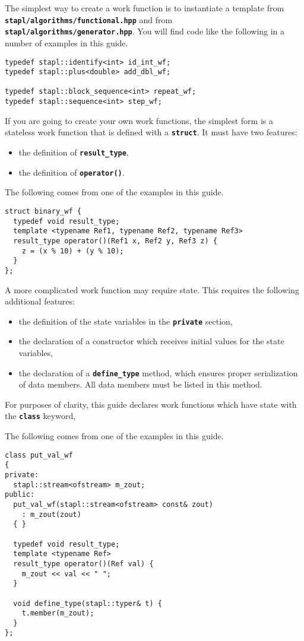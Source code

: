 \documentclass{report}
\begin{document}
The simplest way to create a work function is to instantiate a template
from \texttt{{\bf stapl/algorithms/functional.hpp}} and
from \texttt{{\bf stapl/algorithms/generator.hpp}}. 
You will find code like the following in a number of examples in this guide.

\small
\begin{verbatim}
typedef stapl::identify<int> id_int_wf;
typedef stapl::plus<double> add_dbl_wf;

typedef stapl::block_sequence<int> repeat_wf;
typedef stapl::sequence<int> step_wf;
\end{verbatim}
\normalsize

If you are going to create your own work functions, the simplest form
is a stateless work function that is defined with a 
\texttt{{\bf struct}}.
It must have two features:
\begin{itemize}
\item
the definition of \texttt{{\bf result\_type}},
\item
the definition of \texttt{{\bf operator()}}.
\end{itemize}
The following comes from one of the examples in this guide.

\small
\begin{verbatim}
struct binary_wf {
  typedef void result_type;
  template <typename Ref1, typename Ref2, typename Ref3>
  result_type operator()(Ref1 x, Ref2 y, Ref3 z) {
    z = (x % 10) + (y % 10);
  }
};
\end{verbatim}
\normalsize

A more complicated work function may require state. This requires
the following additional features:
\begin{itemize}
\item
the definition of the state variables in the \texttt{{\bf private}} section,
\item
the declaration of a constructor which receives initial values for the
state variables,
\item
the declaration of a \texttt{{\bf define\_type}} method, which ensures
proper serialization of data members.  All data members must be listed
in this method.
\end{itemize}
For purposes of clarity, this guide declares work functions which have
state with the \texttt{{\bf class}} keyword,

The following comes from one of the examples in this guide.
\small
\begin{verbatim}
class put_val_wf
{
private:
  stapl::stream<ofstream> m_zout;
public:
  put_val_wf(stapl::stream<ofstream> const& zout)
    : m_zout(zout)
  { }

  typedef void result_type;
  template <typename Ref>
  result_type operator()(Ref val) {
    m_zout << val << " ";
  }

  void define_type(stapl::typer& t) {
    t.member(m_zout);
  }
};
\end{verbatim}
\normalsize
\end{document}

